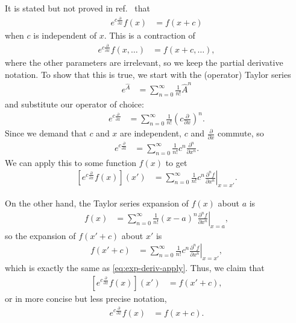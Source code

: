 It is stated but not proved in ref.~\cite{tuckerman1992reversible} that
\begin{align}
	e^{c \frac{\partial}{\partial x}} f(x)
	&= f(x + c)
\end{align}
when $c$ is independent of $x$.
This is a contraction of
\begin{align}
	e^{c \frac{\partial}{\partial x}} f(x, \ldots)
	&= f(x + c, \ldots),
\end{align}
where the other parameters are irrelevant, so we keep the partial derivative notation.
To show that this is true, we start with the (operator) Taylor series~\cite[48]{sakurai1985modern}
\begin{align}
	e^{\hat{A}}
	&= \sum_{n=0}^\infty \frac{1}{n!} \hat{A}^n
\end{align}
and substitute our operator of choice:
\begin{align}
	e^{c \frac{\partial}{\partial x}}
	&= \sum_{n=0}^\infty \frac{1}{n!} \left( c \frac{\partial}{\partial x} \right)^n.
\end{align}
Since we demand that $c$ and $x$ are independent, $c$ and $\frac{\partial}{\partial x}$ commute, so
\begin{align}
	e^{c \frac{\partial}{\partial x}}
	&= \sum_{n=0}^\infty \frac{1}{n!} c^n \frac{\partial^n}{\partial x^n}.
\end{align}
We can apply this to some function $f(x)$ to get
\begin{align}
	\left[ e^{c \frac{\partial}{\partial x}} f(x) \right] (x')
	&= \sum_{n=0}^\infty \frac{1}{n!} c^n \left. \frac{\partial^n f}{\partial x^n} \right|_{x=x'}.
		\label{eq:exp-deriv-apply}
\end{align}

On the other hand, the Taylor series expansion of $f(x)$ about $a$ is~\cite[735]{stewart2008calculus}
\begin{align}
	f(x)
	&= \sum_{n=0}^\infty \frac{1}{n!} (x-a)^n \left. \frac{\partial^n f}{\partial x^n} \right|_{x=a},
\end{align}
so the expansion of $f(x' + c)$ about $x'$ is
\begin{align}
	f(x' + c)
	&= \sum_{n=0}^\infty \frac{1}{n!} c^n \left. \frac{\partial^n f}{\partial x^n} \right|_{x=x'},
\end{align}
which is exactly the same as \cref{eq:exp-deriv-apply}.
Thus, we claim that
\begin{align}
	\left[ e^{c \frac{\partial}{\partial x}} f(x) \right] (x')
	&= f(x' + c),
\end{align}
or in more concise but less precise notation,
\begin{align}
	e^{c \frac{\partial}{\partial x}} f(x)
	&= f(x + c).
\end{align}

